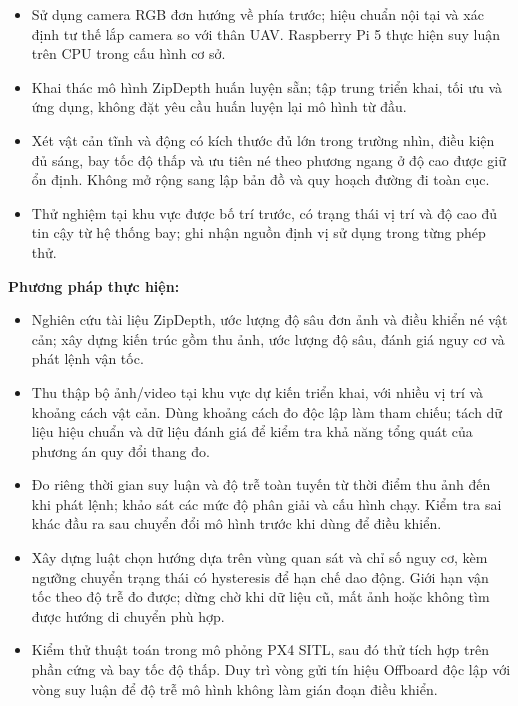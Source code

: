 \begin{mdframed}[style=decuongfield]
\begin{itemize}
\item Sử dụng camera RGB đơn hướng về phía trước; hiệu chuẩn nội tại và xác định tư thế lắp camera so với thân UAV. Raspberry Pi 5 thực hiện suy luận trên CPU trong cấu hình cơ sở.
\item Khai thác mô hình ZipDepth huấn luyện sẵn; tập trung triển khai, tối ưu và ứng dụng, không đặt yêu cầu huấn luyện lại mô hình từ đầu.
\item Xét vật cản tĩnh và động có kích thước đủ lớn trong trường nhìn, điều kiện đủ sáng, bay tốc độ thấp và ưu tiên né theo phương ngang ở độ cao được giữ ổn định. Không mở rộng sang lập bản đồ và quy hoạch đường đi toàn cục.
\item Thử nghiệm tại khu vực được bố trí trước, có trạng thái vị trí và độ cao đủ tin cậy từ hệ thống bay; ghi nhận nguồn định vị sử dụng trong từng phép thử. 
\end{itemize}
\par\vspace{1mm}
\noindent\makebox[\linewidth][l]{\hspace*{-2.5mm}\rule{\dimexpr\linewidth+5mm\relax}{0.4pt}}\par
\vspace{2mm}
\textbf{Phương pháp thực hiện:}
\begin{itemize}
\item Nghiên cứu tài liệu ZipDepth, ước lượng độ sâu đơn ảnh và điều khiển né vật cản; xây dựng kiến trúc gồm thu ảnh, ước lượng độ sâu, đánh giá nguy cơ và phát lệnh vận tốc.
\item Thu thập bộ ảnh/video tại khu vực dự kiến triển khai, với nhiều vị trí và khoảng cách vật cản. Dùng khoảng cách đo độc lập làm tham chiếu; tách dữ liệu hiệu chuẩn và dữ liệu đánh giá để kiểm tra khả năng tổng quát của phương án quy đổi thang đo.
\item Đo riêng thời gian suy luận và độ trễ toàn tuyến từ thời điểm thu ảnh đến khi phát lệnh; khảo sát các mức độ phân giải và cấu hình chạy. Kiểm tra sai khác đầu ra sau chuyển đổi mô hình trước khi dùng để điều khiển.
\item Xây dựng luật chọn hướng dựa trên vùng quan sát và chỉ số nguy cơ, kèm ngưỡng chuyển trạng thái có hysteresis để hạn chế dao động. Giới hạn vận tốc theo độ trễ đo được; dừng chờ khi dữ liệu cũ, mất ảnh hoặc không tìm được hướng di chuyển phù hợp.
\item Kiểm thử thuật toán trong mô phỏng PX4 SITL, sau đó thử tích hợp trên phần cứng và bay tốc độ thấp. Duy trì vòng gửi tín hiệu Offboard độc lập với vòng suy luận để độ trễ mô hình không làm gián đoạn điều khiển.

\end{itemize}
\end{mdframed}
